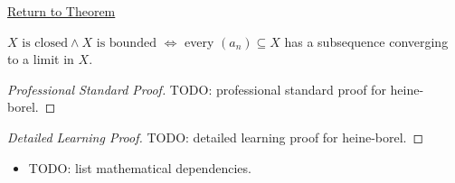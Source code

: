\newpage
{}
\label{prf:heine-borel}

\begin{remark*}[Return]
\hyperref[thm:heine-borel]{Return to Theorem}
\end{remark*}

\begin{theorem*}
$X\text{ is closed} \wedge X\text{ is bounded}$
$\iff$ every $(a_n)\subseteq X$ has a subsequence converging to
a limit in $X$.

\smallskip\noindent
\end{theorem*}

\begin{proof}[Professional Standard Proof]
\LRAProofBodyStart
TODO: professional standard proof for heine-borel.
\end{proof}

\begin{proof}[Detailed Learning Proof]
\LRAProofBodyStart
TODO: detailed learning proof for heine-borel.
\end{proof}

\begin{remark*}
\end{remark*}

\begin{dependencies}
\begin{itemize}
  \item TODO: list mathematical dependencies.
\end{itemize}
\end{dependencies}

\clearpage
